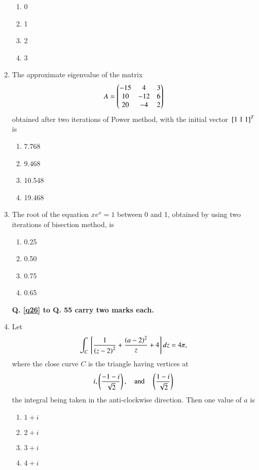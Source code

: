 \documentclass[journal]{IEEEtran}
\begin{document}
\begin{enumerate}
\begin{enumerate}
    \item 0
    \item 1
    \item 2
    \item 3
\end{enumerate}

\item The approximate eigenvalue of the matrix
\begin{align*}
	A = \begin{pmatrix}-15 & 4 & 3 \\
                   10 & -12 & 6 \\
                   20 & -4 & 2 \end{pmatrix}
\end{align*}
obtained after two iterations of Power method, with the initial vector $\sbrak{1 \ 1 \ 1}^T$ is

\begin{enumerate}
    \item 7.768
    \item 9.468
    \item 10.548
    \item 19.468
\end{enumerate}
\item The root of the equation $x e^x = 1$ between 0 and 1, obtained by using two iterations of bisection method, is
\begin{enumerate}
    \item 0.25
    \item 0.50
    \item 0.75
    \item 0.65
\end{enumerate}

\textbf{ Q. \ref{q26} to Q. 55 carry two marks each.}

\item \label{q26} Let 
\begin{align*}
	\int_C {}\left[ \frac{1}{\left(z - 2\right)^2} + \frac{\left(a - 2\right)^2}{z} + 4\right] dz = 4\pi ,
\end{align*}
where the close curve $C$ is the triangle having vertices at
\begin{align*}
	i, \left( \frac{-1-i}{\sqrt{2}}\right), \quad \text{and} \quad \left(\frac{1-i}{\sqrt{2}}\right)
\end{align*}
the integral being taken in the anti-clockwise direction. Then one value of $a$ is
\begin{enumerate}
    \item $1 + i$
    \item $2 + i$
    \item $3 + i$
    \item $4 + i$
\end{enumerate}

 

\end{enumerate}
\end{document}
